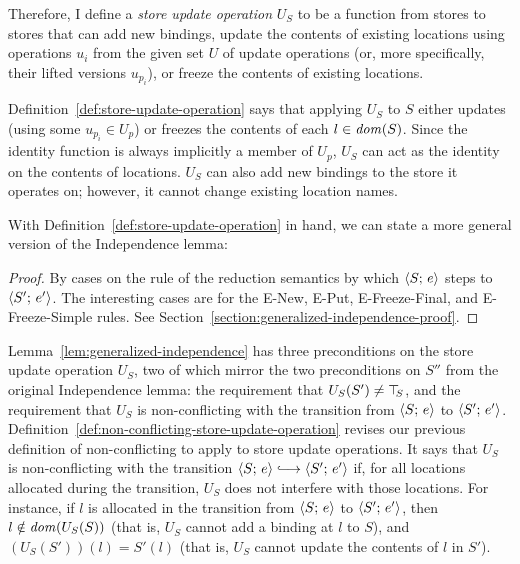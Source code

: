Therefore, I define a \emph{store update operation} $U_S$ to be a
function from stores to stores that can add new bindings, update the
contents of existing locations using operations $u_i$ from the given
set $U$ of update operations (or, more specifically, their lifted
versions $u_{p_i}$), or freeze the contents of existing locations.

\DefStoreUpdateOperation

Definition~\ref{def:store-update-operation} says that applying $U_S$
to $S$ either updates (using some $u_{p_i} \in U_p$) or freezes the
contents of each $l \in \mathit{dom}(S)$.  Since the identity function is
always implicitly a member of $U_p$, $U_S$ can act as the identity on
the contents of locations.  $U_S$ can also add new bindings to the
store it operates on; however, it cannot change existing location
names.

With Definition~\ref{def:store-update-operation} in hand, we can state
a more general version of the Independence lemma:

\LemGeneralizedIndependence
\begin{proof}
  By cases on the rule of the reduction semantics by which
  $\langle S;\, e \rangle$ steps to $\langle S';\, e' \rangle$.  The interesting cases
  are for the {\sc E-New}, {\sc E-Put}, {\sc E-Freeze-Final}, and {\sc
    E-Freeze-Simple} rules.  See
  Section~\ref{section:generalized-independence-proof}.
\end{proof}

Lemma~\ref{lem:generalized-independence} has three preconditions on
the store update operation $U_S$, two of which mirror the two
preconditions on $S''$ from the original Independence lemma: the
requirement that $U_S(S') \neq \top\hspace{-0.85mm}_{S}$, and the requirement that $U_S$
is non-conflicting with the transition from $\langle S;\, e \rangle$ to
$\langle S';\, e' \rangle$.
Definition~\ref{def:non-conflicting-store-update-operation} revises
our previous definition of non-conflicting to apply to store update
operations.  It says that $U_S$ is non-conflicting with the transition
$\config{S}{e} \parstepsto \config{S'}{e'}$ if, for all locations
allocated during the transition, $U_S$ does not interfere with those
locations.  For instance, if $l$ is allocated in the transition from
$\langle S;\, e \rangle$ to $\langle S';\, e' \rangle$, then $l \notin \mathit{dom}(U_S(S))$
(that is, $U_S$ cannot add a binding at $l$ to $S$), and $(U_S(S'))(l)
= S'(l)$ (that is, $U_S$ cannot update the contents of $l$ in $S'$).

\DefNonConflictingStoreUpdateOperation

